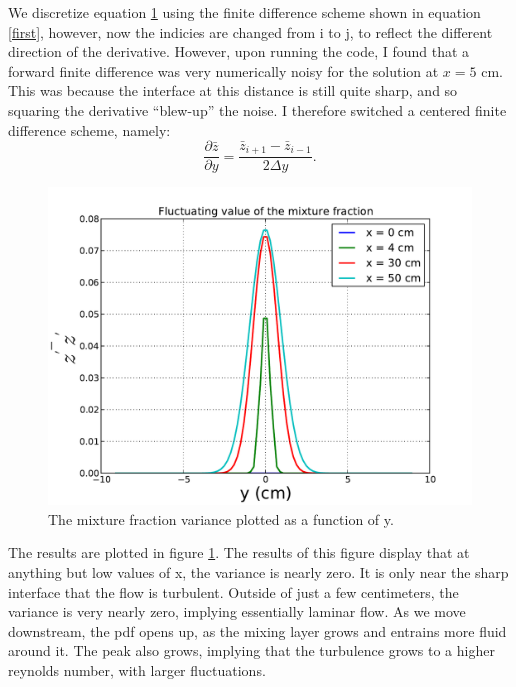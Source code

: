 \documentclass{article}
\begin{document}
We discretize equation \ref{fluc} using the finite difference scheme
shown in equation \ref{first}, however, now the indicies are changed
from i to j, to reflect the different direction of the
derivative. However, upon running the code, I found that a forward
finite difference was very numerically noisy for the solution at $x=5$
cm. This was because the interface at this distance is still quite
sharp, and so squaring the derivative ``blew-up'' the noise. I therefore
switched a centered finite difference scheme, namely:
\begin{equation}
  \frac{\partial \bar z}{\partial y} = \frac{\bar z_{i+1}-\bar z_{i-1}}{2\Delta y}.
\end{equation}

  \begin{figure}[!htb]
   \begin{center}
    \includegraphics[width = 12 cm]{figs/fluc.pdf}
    \caption{The mixture fraction variance plotted as a function of y.}
    \label{fluc}
   \end{center}
  \end{figure}

The results are plotted in figure \ref{fluc}. The results of this figure
display that at anything but low values of x, the variance is nearly
zero. It is only near the sharp interface that the flow is
turbulent. Outside of just a few centimeters, the variance is very
nearly zero, implying essentially laminar flow. As we move downstream,
the pdf opens up, as the mixing layer grows and entrains more fluid
around it. The peak also grows, implying that the turbulence grows to a
higher reynolds number, with larger fluctuations. 

%
%
%
%
\end{document}

